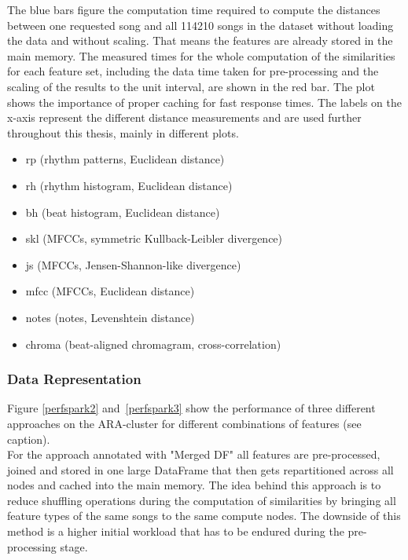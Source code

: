 \noindent The blue bars figure the computation time required to compute the distances between one requested song and all 114210 songs in the dataset without loading the data and without scaling. That means the features are already stored in the main memory. The measured times for the whole computation of the similarities for each feature set, including the data time taken for pre-processing and the scaling of the results to the unit interval, are shown in the red bar. The plot shows the importance of proper caching for fast response times. 
\noindent The labels on the x-axis represent the different distance measurements and are used further throughout this thesis, mainly in different plots. 

\begin{itemize}
	\setlength\itemsep{-0.5em}
	\item rp (rhythm patterns, Euclidean distance)
	\item rh (rhythm histogram, Euclidean distance)
	\item bh (beat histogram, Euclidean distance)
	\item skl (MFCCs, symmetric Kullback-Leibler divergence)
	\item js (MFCCs, Jensen-Shannon-like divergence)
	\item mfcc (MFCCs, Euclidean distance)
	\item notes (notes, Levenshtein distance)
	\item chroma (beat-aligned chromagram, cross-correlation)
\end{itemize}

\subsubsection{Data Representation}

\noindent Figure \ref {perfspark2} and~\ref{perfspark3} show the performance of three different approaches on the ARA-cluster for different combinations of features (see caption).\\
\noindent For the approach annotated with "Merged DF" all features are pre-processed, joined and stored in one large DataFrame that then gets repartitioned across all nodes and cached into the main memory. The idea behind this approach is to reduce shuffling operations during the computation of similarities by bringing all feature types of the same songs to the same compute nodes. The downside of this method is a higher initial workload that has to be endured during the pre-processing stage. 

